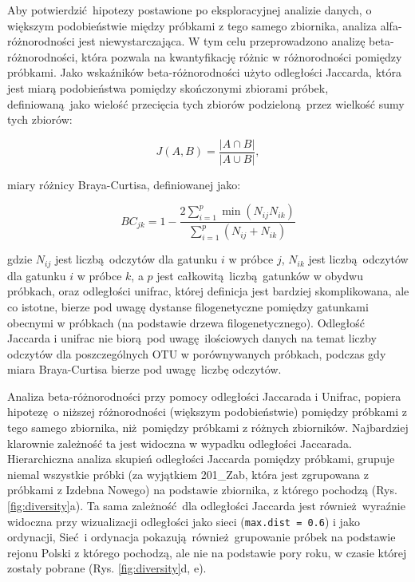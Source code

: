 \documentclass[two column, twoside, a4paper]{article}
\begin{document}
Aby potwierdzić hipotezy postawione po eksploracyjnej analizie danych, o większym podobieństwie między próbkami z tego samego zbiornika, analiza alfa-różnorodności jest niewystarczająca. W tym celu przeprowadzono analizę beta-różnorodności, która pozwala na kwantyfikację różnic w różnorodności pomiędzy próbkami. Jako wskaźników beta-różnorodności użyto odległości Jaccarda, która jest miarą podobieństwa pomiędzy skończonymi zbiorami próbek, definiowaną jako wielość przecięcia tych zbiorów podzieloną przez wielkość sumy tych zbiorów:

\begin{equation}
  J(A, B) = \frac{|A \cap B|}{|A \cup B|},
\end{equation}

miary różnicy Braya-Curtisa, definiowanej jako:

\begin{equation}
  BC_{jk} = 1 - \frac{ 2 \displaystyle \sum^{p}_{i=1} \min{(N_{ij} N_{ik})} }{\displaystyle \sum^{p}_{i=1} (N_{ij} + N_{ik}) }
\end{equation}

gdzie $N_{ij}$ jest liczbą odczytów dla gatunku $i$ w próbce $j$, $N_{ik}$ jest liczbą odczytów dla gatunku $i$ w próbce $k$, a $p$ jest całkowitą liczbą gatunków w obydwu próbkach, oraz odległości unifrac, której definicja jest bardziej skomplikowana, ale co istotne, bierze pod uwagę dystanse filogenetyczne pomiędzy gatunkami obecnymi w próbkach (na podstawie drzewa filogenetycznego). Odległość Jaccarda i unifrac nie biorą pod uwagę ilościowych danych na temat liczby odczytów dla poszczególnych OTU w porównywanych próbkach, podczas gdy miara Braya-Curtisa bierze pod uwagę liczbę odczytów. 

Analiza beta-różnorodności przy pomocy odległości Jaccarada i Unifrac, popiera hipotezę o niższej różnorodności (większym podobieństwie) pomiędzy próbkami z tego samego zbiornika, niż pomiędzy próbkami z różnych zbiorników. Najbardziej klarownie zależność ta jest widoczna w wypadku odległości Jaccarada. Hierarchiczna analiza skupień odległości Jaccarda pomiędzy próbkami, grupuje niemal wszystkie próbki (za wyjątkiem 201\_Zab, która jest zgrupowana z próbkami z Izdebna Nowego) na podstawie zbiornika, z którego pochodzą (Rys. \ref{fig:diversity}a). Ta sama zależność dla odległości Jaccarda jest również wyraźnie widoczna przy wizualizacji odległości jako sieci (\texttt{max.dist = 0.6}) i jako ordynacji, Sieć i ordynacja pokazują również grupowanie próbek na podstawie rejonu Polski z którego pochodzą, ale nie na podstawie pory roku, w czasie której zostały pobrane (Rys. \ref{fig:diversity}d, e).
\end{document}
